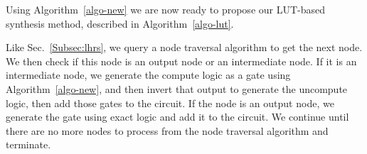 Using Algorithm~\ref{algo-new} we are now ready to propose our LUT-based synthesis
method, described in Algorithm~\ref{algo-lut}.

Like Sec.~\ref{Subsec:lhrs}, we query a node traversal algorithm to get the next
node. We then check if this node is an output node or an intermediate node. If it is an
intermediate node, we generate the compute logic as a  gate using Algorithm~\ref{algo-new},
and then invert that output to generate the uncompute logic, then add those gates to the
circuit. If the node is an output node, we generate the  gate using exact logic and add
it to the circuit. We continue until there are no more nodes to process from the node
traversal algorithm and terminate.





